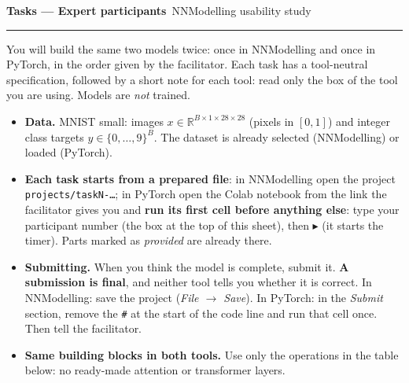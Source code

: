 \documentclass[10pt,a4paper]{article}
\newcommand{\idbox}[1]{\fbox{\rule[-6pt]{0pt}{20pt}\small\bfseries #1:\hspace{3.2cm}}}
\begin{document}
\small

{\Large\bfseries Tasks — Expert participants}\ {\footnotesize NNModelling usability study}\hfill\idbox{Participant ID}

\vspace{4pt}\hrule\vspace{6pt}

You will build the same two models twice: once in NNModelling and once in
PyTorch, in the order given by the facilitator. Each task has a tool-neutral
specification, followed by a short note for each tool: read only the box of
the tool you are using. Models are \emph{not} trained.

\begin{itemize}
    \item \textbf{Data.} MNIST small: images \(x\in\mathbb{R}^{B\times1\times28\times28}\)
    (pixels in \([0,1]\)) and integer class targets \(y\in\{0,\dots,9\}^{B}\).
    The dataset is already selected (NNModelling) or loaded (PyTorch).
    \item \textbf{Each task starts from a prepared file}: in NNModelling open the project
    \texttt{projects/taskN-\ldots}; in PyTorch open the Colab notebook from the link the
    facilitator gives you and \textbf{run its first cell before anything else}: type your participant
    number (the box at the top of this sheet), then \(\blacktriangleright\) (it starts the timer). Parts marked as
    \emph{provided} are already there.
    \item \textbf{Submitting.} When you think the model is complete, submit it.
    \textbf{A submission is final}, and neither tool tells you whether it is correct.
    In NNModelling: save the project (\emph{File \(\rightarrow\) Save}). In PyTorch: in the
    \emph{Submit} section, remove the \texttt{\#} at the start of the code line and run that
    cell once. Then tell the facilitator.
    \item \textbf{Same building blocks in both tools.} Use only the operations
    in the table below: no ready-made attention or transformer layers.
\end{itemize}
\end{document}

